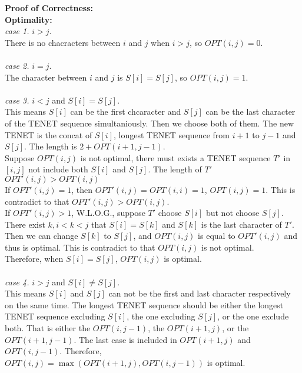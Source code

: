 \documentclass[10.5pt]{article}
\newenvironment{main idea}{\textbf{Main Idea: }}{}
\newenvironment{prcor}{\textbf{Proof of Correctness: }\\}{}
\theoremstyle{remark}
\begin{document}
\pagebreak
\begin{prcor}
	\textbf{Optimality:}\\
	\textit{case 1.} \(i > j\). \\
	There is no chacracters between \(i\) and \(j\) when \(i > j\), so \(OPT(i, j) = 0\).\\\\
	\textit{case 2.} \(i = j\). \\
	The character between \(i\) and \(j\) is \(S[i] = S[j]\), so \(OPT(i, j) = 1\).\\\\
	\textit{case 3.} \(i < j\) and \(S[i] = S[j]\). \\
	This means \(S[i]\) can be the first chcaracter and \(S[j]\) can be the last character of the TENET sequence simultaniously. Then we choose both of them. The new TENET is the concat of \(S[i]\), longest TENET sequence from \(i+1\) to \(j - 1\) and \(S[j]\). The length is \(2 + OPT(i + 1, j - 1)\).\\
	Suppose \(OPT(i,j)\) is not optimal, there must exists a TENET sequence \(T'\) in \([i,j]\) not include both \(S[i]\) and \(S[j]\). The length of \(T'\) \(OPT'(i,j) > OPT(i,j)\)\\
	If \(OPT'(i,j) = 1\), then \(OPT'(i,j) = OPT(i,i) = 1\), \(OPT(i,j) = 1\). This is contradict to that \(OPT'(i,j) > OPT(i,j)\).\\
	If \(OPT'(i,j) > 1\), W.L.O.G., suppose \(T'\) choose \(S[i]\) but not choose \(S[j]\). There exist \(k, i<k<j\) that \(S[i] = S[k]\) and \(S[k]\) is the last character of \(T'\). Then we can change \(S[k]\) to \(S[j]\), and \(OPT(i,j)\) is equal to \(OPT'(i,j)\) and thus is optimal. This is contradict to that \(OPT(i, j)\) is not optimal.\\
	Therefore, when \(S[i] = S[j]\), \(OPT(i,j)\) is optimal.\\\\
	\textit{case 4.} \(i > j\) and \(S[i] \neq S[j]\). \\
	This means \(S[i]\) and \(S[j]\) can not be the first and last character respectively on the same time. The longest TENET sequence should be either the longest TENET sequence excluding \(S[i]\), the one excluding \(S[j]\), or the one exclude both. That is either the \(OPT(i, j -1)\), the \(OPT(i + 1, j)\), or the \(OPT(i + 1, j - 1)\). The last case is included in \(OPT(i+1, j)\) and \(OPT(i, j-1)\). Therefore, \(OPT(i,j) = \max(OPT(i + 1, j), OPT(i, j - 1))\) is optimal.\\\\

\end{prcor}
\end{document}
